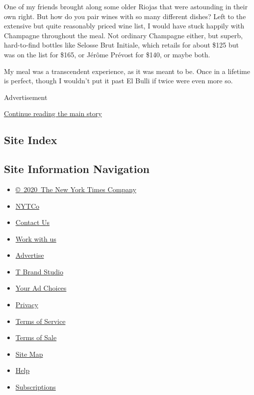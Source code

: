 One of my friends brought along some older Riojas that were astounding
in their own right. But how do you pair wines with so many different
dishes? Left to the extensive but quite reasonably priced wine list, I
would have stuck happily with Champagne throughout the meal. Not
ordinary Champagne either, but superb, hard-to-find bottles like Selosse
Brut Initiale, which retails for about \$125 but was on the list for
\$165, or Jérôme Prévost for \$140, or maybe both.

My meal was a transcendent experience, as it was meant to be. Once in a
lifetime is perfect, though I wouldn't put it past El Bulli if twice
were even more so.

Advertisement

\protect\hyperlink{after-bottom}{Continue reading the main story}

\hypertarget{site-index}{%
\subsection{Site Index}\label{site-index}}

\hypertarget{site-information-navigation}{%
\subsection{Site Information
Navigation}\label{site-information-navigation}}

\begin{itemize}
\tightlist
\item
  \href{https://help.nytimes3xbfgragh.onion/hc/en-us/articles/115014792127-Copyright-notice}{©~2020~The
  New York Times Company}
\end{itemize}

\begin{itemize}
\tightlist
\item
  \href{https://www.nytco.com/}{NYTCo}
\item
  \href{https://help.nytimes3xbfgragh.onion/hc/en-us/articles/115015385887-Contact-Us}{Contact
  Us}
\item
  \href{https://www.nytco.com/careers/}{Work with us}
\item
  \href{https://nytmediakit.com/}{Advertise}
\item
  \href{http://www.tbrandstudio.com/}{T Brand Studio}
\item
  \href{https://www.nytimes3xbfgragh.onion/privacy/cookie-policy\#how-do-i-manage-trackers}{Your
  Ad Choices}
\item
  \href{https://www.nytimes3xbfgragh.onion/privacy}{Privacy}
\item
  \href{https://help.nytimes3xbfgragh.onion/hc/en-us/articles/115014893428-Terms-of-service}{Terms
  of Service}
\item
  \href{https://help.nytimes3xbfgragh.onion/hc/en-us/articles/115014893968-Terms-of-sale}{Terms
  of Sale}
\item
  \href{https://spiderbites.nytimes3xbfgragh.onion}{Site Map}
\item
  \href{https://help.nytimes3xbfgragh.onion/hc/en-us}{Help}
\item
  \href{https://www.nytimes3xbfgragh.onion/subscription?campaignId=37WXW}{Subscriptions}
\end{itemize}
